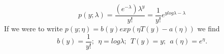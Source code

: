 \begin{answer}
$$p(y; \lambda) =\frac{(e^{-\lambda})\lambda^y}{y!} = \frac{1}{y!}e^{ylog\lambda  - \lambda}$$
If we were to write $p(y;\eta) = b(y)exp(\eta T(y) - a(\eta))$
we find 
$$b(y) = \frac{1}{y!};\ \ \eta = log\lambda; \ \ T(y) = y;\ \ a(\eta) = e^\eta.$$
\end{answer}
